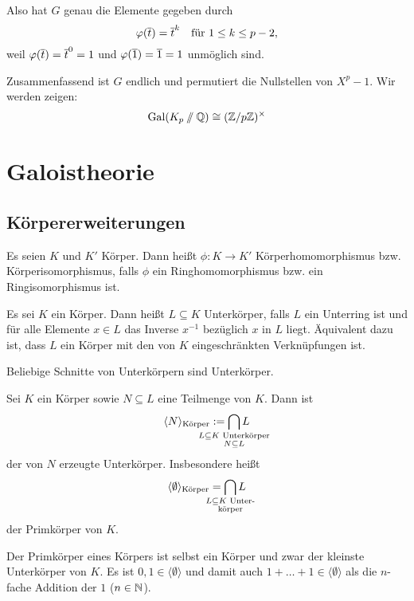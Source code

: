 \documentclass[12pt,a4paper]{scrartcl}
\begin{document}
Also hat $G$ genau die Elemente gegeben durch \[ \varphi(\overline t) = \overline t^k \quad \text{für $1\le k \le p-2$}, \]
weil $\varphi(\overline t) = \overline t^0 = 1$ und $\varphi(\overline 1) = \overline 1 = 1$ unmöglich sind.

Zusammenfassend ist $G$ endlich und permutiert die Nullstellen von $X^p-1$. Wir werden zeigen:
\[
\operatorname{Gal}(K_p \sslash \mathbb Q) \cong (\mathbb Z/p\mathbb Z)^\times
\]

\section{Galoistheorie}
\subsection{Körpererweiterungen}
\begin{defi}
	Es seien $K$ und $K'$ Körper. Dann heißt $\phi : K \to K'$ Körperhomomorphismus bzw. Körperisomorphismus, falls $\phi$ ein Ringhomomorphismus bzw. ein Ringisomorphismus ist.
\end{defi}

\begin{defi}
	Es sei $K$ ein Körper. Dann heißt $L \subseteq K$ Unterkörper, falls $L$ ein Unterring ist und für alle Elemente $x \in L$ das Inverse $x^{-1}$ bezüglich $x$ in $L$ liegt. Äquivalent dazu ist, dass $L$ ein Körper mit den von $K$ eingeschränkten Verknüpfungen ist.
\end{defi}

\begin{bem}
	Beliebige Schnitte von Unterkörpern sind Unterkörper.
\end{bem}

\begin{defi}
	Sei $K$ ein Körper sowie $N\subseteq L$ eine Teilmenge von $K$. Dann ist
	\[
	\langle N\rangle_\text{Körper} := \bigcap_{\mathclap{\substack{L \subseteq K\text{ Unterkörper}\\N\subseteq L}}} L
	\]
	der von $N$ erzeugte Unterkörper. Insbesondere heißt
	\[
	\langle \emptyset\rangle_\text{Körper} = \bigcap_{\mathclap{\substack{L \subseteq K\text{ Unter-}\\\text{körper}}}} L
	\]
	der Primkörper von $K$.
\end{defi}


\begin{bem}
	Der Primkörper eines Körpers ist selbst ein Körper und zwar der kleinste Unterkörper von $K$. Es ist $0,1\in \langle\emptyset\rangle$ und damit auch $1+\dots+1 \in \langle \emptyset\rangle$ als die $n$-fache Addition der $1$ ($n\in\mathbb N$).
\end{bem}
\end{document}
